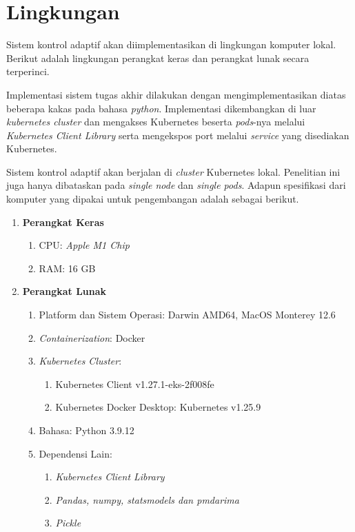 \section{Lingkungan}

Sistem kontrol adaptif akan diimplementasikan di lingkungan komputer lokal. Berikut adalah lingkungan perangkat keras dan perangkat lunak secara terperinci.

Implementasi sistem tugas akhir dilakukan dengan mengimplementasikan diatas beberapa kakas pada bahasa \textit{python}. Implementasi dikembangkan di luar \textit{kubernetes cluster} dan mengakses Kubernetes beserta \textit{pods}-nya melalui \textit{Kubernetes Client Library} serta mengekspos port melalui \textit{service} yang disediakan Kubernetes. 

Sistem kontrol adaptif akan berjalan di \textit{cluster} Kubernetes lokal. Penelitian ini juga hanya dibataskan pada \textit{single node} dan \textit{single pods}. Adapun spesifikasi dari komputer yang dipakai untuk pengembangan adalah sebagai berikut.
\begin{enumerate}
    \item \textbf{Perangkat Keras}
    
        \begin{enumerate}
            \item CPU: \textit{Apple M1 Chip}
            \item RAM: 16 GB
        \end{enumerate}
    
    \item \textbf{Perangkat Lunak}
        
        \begin{enumerate}
            \item Platform dan Sistem Operasi: Darwin AMD64, MacOS Monterey 12.6
            \item \textit{Containerization}: Docker
            \item \textit{Kubernetes Cluster}:
                \begin{enumerate}
                    \item Kubernetes Client v1.27.1-eks-2f008fe
                    \item Kubernetes Docker Desktop: Kubernetes v1.25.9
                \end{enumerate}
            \item Bahasa: Python 3.9.12
            \item Dependensi Lain:
                \begin{enumerate}
                    \item \textit{Kubernetes Client Library}
                    \item \textit{Pandas, numpy, statsmodels dan pmdarima}
                    \item \textit{Pickle}
                \end{enumerate}
        \end{enumerate}
\end{enumerate}